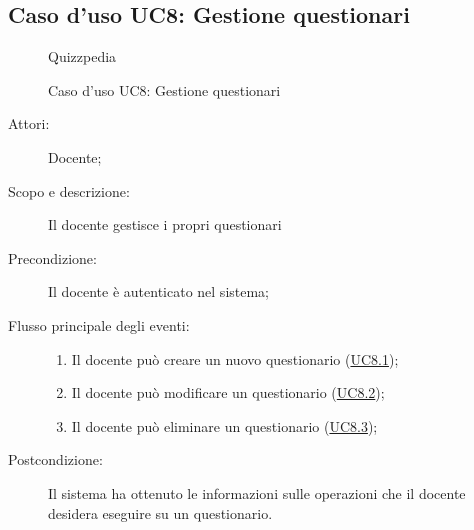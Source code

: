 \subsection{Caso d'uso UC8: Gestione questionari}
        \begin{figure}[H]
            \centering
            \begin{resizedtikzpicture}{\textwidth}
		\begin{umlsystem}[x=0, fill=lightgray!20]{Quizzpedia}
		\end{umlsystem}
            \end{resizedtikzpicture}
            \caption{Caso d'uso UC8: Gestione questionari}
            \label{fig:UC8} 
        \end{figure}
    \begin{description}
\item[Attori:] Docente;
\item[Scopo e descrizione:] Il docente gestisce i propri questionari
      \item[Precondizione:] Il docente è autenticato nel sistema;

        \item[Flusso principale degli eventi:] \begin{enumerate}
          \item Il docente può creare un nuovo questionario (\hyperlink{UC8.1}{UC8.1});
          \item Il docente può modificare un questionario (\hyperlink{UC8.2}{UC8.2});
          \item Il docente può eliminare un questionario (\hyperlink{UC8.3}{UC8.3});

      \end{enumerate}
    \item[Postcondizione:] Il sistema ha ottenuto le informazioni sulle operazioni che il docente desidera eseguire su un questionario.
  \end{description}
\hypertarget{UC8.1}{}
